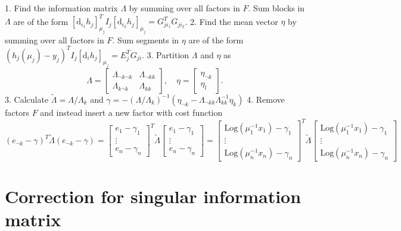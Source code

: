 1. Find the information matrix $\Lambda$ by summing over all factors in $F$. Sum blocks in $\Lambda$ are of the form $[\mathrm{d}_{i_1} h_j]_{\mu_j}^T I_j [\mathrm{d}_{i_2} h_j]_{\mu_j} = G_{ji_1}^T G_{ji_2}$.
2. Find the mean vector $\eta$ by summing over all factors in $F$. Sum segments in $\eta$ are of the form $(h_j(\mu_j) - y_j)^T I_j [\mathrm{d}_i h_j]_{\mu_j} = E_{j}^TG_{ji}$.
3. Partition $\Lambda$ and $\eta$ as
$$
 \Lambda = \begin{bmatrix}
   \Lambda_{\lnot k \lnot k} & \Lambda_{\lnot k k} \\ \Lambda_{k \lnot k} & \Lambda_{kk}
 \end{bmatrix}, \quad \eta = \begin{bmatrix}
   \eta_{\lnot k} \\
   \eta_l
 \end{bmatrix}.
$$
3. Calculate $\tilde \Lambda = \Lambda/ \Lambda_{k}$ and $\gamma = - (\Lambda / \Lambda_k)^{-1} \left( \eta_{\lnot k} - \Lambda_{\lnot k k} \Lambda_{kk}^{-1}   \eta_k \right)$
4. Remove factors $F$ and instead insert a new factor with cost function
$$
(e_{\lnot k} - \gamma)^T \tilde \Lambda (e_{\lnot k} - \gamma) =
 \begin{bmatrix}
  e_1 - \gamma_1 \\
  \vdots \\
  e_n - \gamma_n
\end{bmatrix}^T \tilde \Lambda \begin{bmatrix}
  e_1 - \gamma_1 \\
  \vdots \\
  e_n - \gamma_n
\end{bmatrix} =
  \begin{bmatrix}
    \mathrm{Log}(\mu_1^{-1} x_1) - \gamma_1 \\
    \vdots \\
    \mathrm{Log}(\mu_n^{-1} x_n) - \gamma_n
  \end{bmatrix}^T \tilde \Lambda \begin{bmatrix}
    \mathrm{Log}(\mu_1^{-1} x_1) - \gamma_1 \\
    \vdots \\
    \mathrm{Log}(\mu_n^{-1} x_n) - \gamma_n
  \end{bmatrix}
$$

\section{Correction for singular information matrix}

